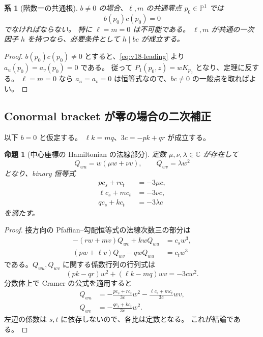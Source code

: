 \documentclass[11pt,a4paper]{ltjsarticle}
\newtheorem{proposition}[theorem]{命題}
\newtheorem{corollary}[theorem]{系}
\theoremstyle{remark}\newtheorem{remark}[theorem]{注意}
\begin{document}
\begin{corollary}[階数一の共通根]\label{cor:v18-rankone-root}
$b\ne0$ の場合、$\ell,m$ の共通零点 $p_0\in\mathbb P^1$ では
\[
                              b(p_0)c(p_0)=0
\]
でなければならない。
特に $\ell=m=0$ は不可能である。
$\ell,m$ が共通の一次因子 $h$ を持つなら、必要条件として $h\mid bc$ が成立する。
\end{corollary}
\begin{proof}
$b(p_0)c(p_0)\ne0$ とすると、\eqref{eq:v18-leading} より
$a_u(p_0)=a_v(p_0)=0$ である。
従って $P_1(p_0,z)=wK_{p_0}$ となり、定理に反する。
$\ell=m=0$ なら $a_u=a_v=0$ は恒等式なので、$bc\ne0$ の一般点を取ればよい。
\end{proof}

\subsection{Conormal bracket が零の場合の二次補正}

以下 $b=0$ と仮定する。
$\ell k=mq$、$3c=-pk+qr$ が成立する。
\begin{proposition}[中心座標の Hamiltonian の法線部分]\label{prop:v18-qw}
定数 $\mu,\nu,\lambda\in\mathbb C$ が存在して
\begin{equation}\label{eq:v18-qw}
 Q_{wu}=w(\mu w+\nu v),\qquad Q_{wv}=\lambda w^2
\end{equation}
となり、binary 恒等式
\begin{align}
 p c_s+r c_t&=-3\mu c,\label{eq:v18-logp}\\
 \ell c_s+m c_t&=-3\nu c,\label{eq:v18-logl}\\
 q c_s+k c_t&=-3\lambda c\label{eq:v18-logq}
\end{align}
を満たす。
\end{proposition}
\begin{proof}
接方向の Pfaffian--勾配恒等式の法線次数三の部分は
\begin{align*}
 -(rw+mv)Q_{wv}+kwQ_{wu}&=c_s w^3,\\
 (pw+\ell v)Q_{wv}-qwQ_{wu}&=c_t w^3
\end{align*}
である。$Q_{wu},Q_{wv}$ に関する係数行列の行列式は
\[
 (pk-qr)w^2+(\ell k-mq)wv=-3cw^2.
\]
分数体上で Cramer の公式を適用すると
\begin{align*}
 Q_{wu}&=-\frac{p c_s+r c_t}{3c}w^2
          -\frac{\ell c_s+m c_t}{3c}wv,\\
 Q_{wv}&=-\frac{q c_s+k c_t}{3c}w^2.
\end{align*}
左辺の係数は $s,t$ に依存しないので、各比は定数となる。
これが結論である。
\end{proof}
\end{document}
